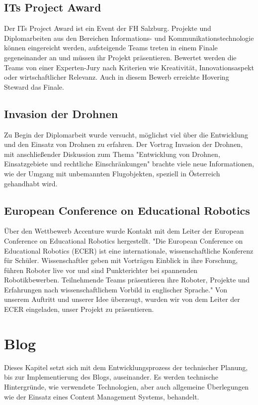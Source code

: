     \subsection*{ITs Project Award}
    Der {ITs Project Award\cite{its}} ist ein Event der FH Salzburg. Projekte und Diplomarbeiten aus den Bereichen Informations- und Kommunikationstechnologie
    können eingereicht werden, aufsteigende Teams treten in einem Finale gegeneinander an und müssen ihr Projekt präsentieren. Bewertet werden die
    Teams von einer Experten-Jury nach Kriterien wie Kreativität, Innovationsaspekt oder wirtschaftlicher Relevanz.
    Auch in diesem Bewerb erreichte Hovering Steward das Finale.

    \subsection*{Invasion der Drohnen}
    Zu Begin der Diplomarbeit wurde versucht, möglichst viel über die Entwicklung und den Einsatz von Drohnen zu erfahren.
    Der Vortrag {Invasion der Drohnen\cite{invasionderdrohnen}}, mit anschließender Diskussion zum Thema "Entwicklung von Drohnen, Einsatzgebiete und rechtliche Einschränkungen" brachte
    viele neue Informationen, wie der Umgang mit unbemannten Flugobjekten, speziell in Österreich gehandhabt wird.

    \subsection*{European Conference on Educational Robotics}
    Über den Wettbewerb Accenture wurde Kontakt mit dem Leiter der {European Conference on Educational Robotics\cite{ecer}} hergestellt.
    "Die European Conference on Educational Robotics (ECER) ist eine internationale, wissenschaftliche Konferenz für Schüler. Wissenschaftler
    geben mit Vorträgen Einblick in ihre Forschung, führen Roboter live vor und sind Punkterichter bei spannenden Robotikbewerben.
    Teilnehmende Teams präsentieren ihre Roboter, Projekte und Erfahrungen nach wissenschaftlichem
    Vorbild in englischer Sprache."
    Von unserem Auftritt und unserer Idee überzeugt, wurden wir von dem Leiter der ECER eingeladen, unser Projekt zu präsentieren.

\section{Blog}
Dieses Kapitel setzt sich mit dem Entwicklungsprozess der technischer Planung, bis zur Implementierung
des Blogs, auseinander. Es werden technische Hintergründe, wie verwendete Technologien, aber
auch allgemeine Überlegungen wie der Einsatz eines Content Management Systems, behandelt.

